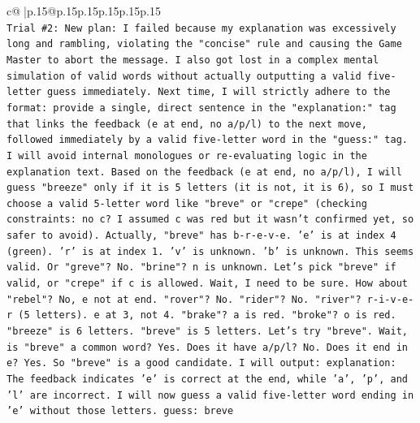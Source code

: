 \documentclass{article}
\begin{document}
{\begin{supertabular}{c@{$\;$}|p{.15\linewidth}@{}p{.15\linewidth}p{.15\linewidth}p{.15\linewidth}p{.15\linewidth}p{.15\linewidth}}
{{{\\ 
\texttt{Trial \#2: New plan: I failed because my explanation was excessively long and rambling, violating the "concise" rule and causing the Game Master to abort the message. I also got lost in a complex mental simulation of valid words without actually outputting a valid five{-}letter guess immediately. Next time, I will strictly adhere to the format: provide a single, direct sentence in the "explanation:" tag that links the feedback (e at end, no a/p/l) to the next move, followed immediately by a valid five{-}letter word in the "guess:" tag. I will avoid internal monologues or re{-}evaluating logic in the explanation text. Based on the feedback (e at end, no a/p/l), I will guess "breeze" only if it is 5 letters (it is not, it is 6), so I must choose a valid 5{-}letter word like "breve" or "crepe" (checking constraints: no c? I assumed c was red but it wasn't confirmed yet, so safer to avoid). Actually, "breve" has b{-}r{-}e{-}v{-}e. 'e' is at index 4 (green). 'r' is at index 1. 'v' is unknown. 'b' is unknown. This seems valid. Or "greve"? No. "brine"? n is unknown. Let's pick "breve" if valid, or "crepe" if c is allowed. Wait, I need to be sure. How about "rebel"? No, e not at end. "rover"? No. "rider"? No. "river"? r{-}i{-}v{-}e{-}r (5 letters). e at 3, not 4. "brake"? a is red. "broke"? o is red. "breeze" is 6 letters. "breve" is 5 letters. Let's try "breve". Wait, is "breve" a common word? Yes. Does it have a/p/l? No. Does it end in e? Yes. So "breve" is a good candidate. I will output: explanation: The feedback indicates 'e' is correct at the end, while 'a', 'p', and 'l' are incorrect. I will now guess a valid five{-}letter word ending in 'e' without those letters. guess: breve} \\
\\ 
}}}
\end{supertabular}}
\end{document}
